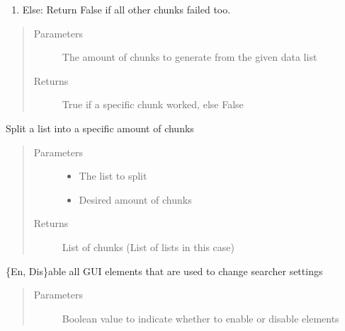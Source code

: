 \documentclass[letterpaper,10pt,english]{sphinxmanual}
\begin{document}
\begin{fulllineitems}
\begin{fulllineitems}
\begin{description}
\begin{enumerate}
\item {} 
Else: Return False if all other chunks failed too.

\end{enumerate}

\end{description}
\begin{quote}\begin{description}
\item[{Parameters}] \leavevmode
{} \textendash{} The amount of chunks to generate from the given data list

\item[{Returns}] \leavevmode
True if a specific chunk worked, else False

\end{description}\end{quote}

\end{fulllineitems}


\begin{fulllineitems}
\label{\detokenize{src:src.SearcherTab.SearcherTab.splitLists}}
Split a list into a specific amount of chunks
\begin{quote}\begin{description}
\item[{Parameters}] \leavevmode\begin{itemize}
\item {} 
 \textendash{} The list to split

\item {} 
 \textendash{} Desired amount of chunks

\end{itemize}

\item[{Returns}] \leavevmode
List of chunks (List of lists in this case)

\end{description}\end{quote}

\end{fulllineitems}


\begin{fulllineitems}
\label{\detokenize{src:src.SearcherTab.SearcherTab.toggleGUIElements}}
\{En, Dis\}able all GUI elements that are used to change searcher settings
\begin{quote}\begin{description}
\item[{Parameters}] \leavevmode
{} \textendash{} Boolean value to indicate whether to enable or disable elements


\end{description}
\end{quote}
\end{fulllineitems}
\end{fulllineitems}
\end{document}
